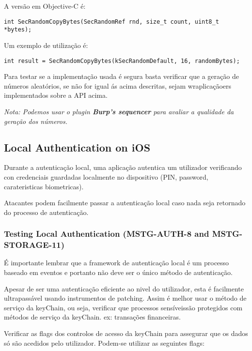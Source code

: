  
A versão em Objective-C é:
\begin{lstlisting}[basicstyle=\small,]
 int SecRandomCopyBytes(SecRandomRef rnd, size_t count, uint8_t *bytes);
\end{lstlisting}
Um exemplo de utilização é:
\begin{lstlisting}[basicstyle=\small,]
  int result = SecRandomCopyBytes(kSecRandomDefault, 16, randomBytes);
\end{lstlisting}

Para testar se a implementação usada é segura basta verificar que a geração de números aleatórios, se não for igual ás acima descritas, sejam wraplicaçãoers implementados sobre a API acima. 

\textit{Nota: Podemos usar o plugin \textbf{Burp's sequencer} para avaliar a qualidade da geração dos números.}


\subsection{Local Authentication on iOS}
\hfill\par
Durante a autenticação local, uma aplicação autentica um utilizador verificando con credenciais guardadas localmente no dispositivo (PIN, password, carateristicas biometricas).

Atacantes podem facilmente passar a autenticação local caso nada seja retornado do processo de autenticação.


\subsubsection{Testing Local Authentication (MSTG-AUTH-8 and MSTG-STORAGE-11)}
\hfill\par
\hfill\par
É importante lembrar que a framework de autenticação local é um processo baseado em eventos e portanto não deve ser o único método de autenticação.\par
\hfill\par


Apesar de ser uma autenticação eficiente ao nivel do utilizador, esta é facilmente ultrapassável usando instrumentos de patching. Assim é melhor usar o método de serviço da keyChain, ou seja, verificar que processos sensíveissão protegidos com métodos de serviço da keyChain. ex: transações financeiras.\par

Verificar as flags dos controlos de acesso da keyChain para assegurar que os dados só são acedidos pelo utilizador. Podem-se utilizar as seguintes flags: 

